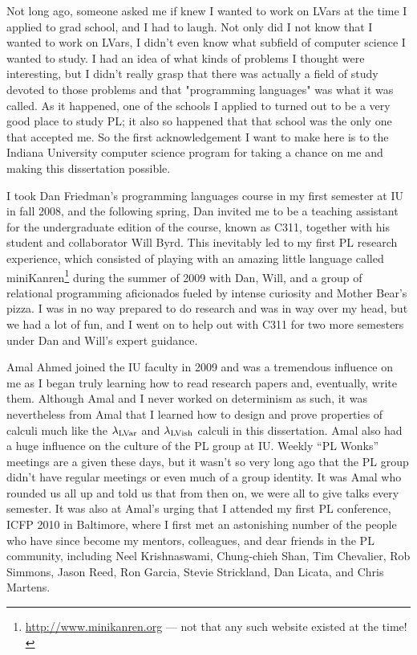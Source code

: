 Not long ago, someone asked me if knew I wanted to work on LVars at the time I applied to grad school, and I had to laugh.  Not only did I not know that I wanted to work on LVars, I didn't even know what subfield of computer science I wanted to study.  I had an idea of what kinds of problems I thought were interesting, but I didn't really grasp that there was actually a field of study devoted to those problems and that "programming languages" was what it was called.  As it happened, one of the schools I applied to turned out to be a very good place to study PL; it also so happened that that school was the only one that accepted me.  So the first acknowledgement I want to make here is to the Indiana University computer science program for taking a chance on me and making this dissertation possible.

I took Dan Friedman's programming languages course in my first semester at IU in fall 2008, and the following spring, Dan invited me to be a teaching assistant for the undergraduate edition of the course, known as C311, together with his student and collaborator Will Byrd.  This inevitably led to my first PL research experience, which consisted of playing with an amazing little language called miniKanren\footnote{\url{http://www.minikanren.org} --- not that any such website existed at the time!} during the summer of 2009 with Dan, Will, and a group of relational programming aficionados fueled by intense curiosity and Mother Bear's pizza.  I was in no way prepared to do research and was in way over my head, but we had a lot of fun, and I went on to help out with C311 for two more semesters under Dan and Will's expert guidance.

Amal Ahmed joined the IU faculty in 2009 and was a tremendous influence on me as I began truly learning how to read research papers and, eventually, write them.  Although Amal and I never worked on determinism as such, it was nevertheless from Amal that I learned how to design and prove properties of calculi much like the $\lambda_{\textrm{LVar}}$ and $\lambda_{\textrm{LVish}}$ calculi in this dissertation.  Amal also had a huge influence on the culture of the PL group at IU.  Weekly ``PL Wonks'' meetings are a given these days, but it wasn't so very long ago that the PL group didn't have regular meetings or even much of a group identity.  It was Amal who rounded us all up and told us that from then on, we were all to give talks every semester.  It was also at Amal's urging that I attended my first PL conference, ICFP 2010 in Baltimore, where I first met an astonishing number of the people who have since become my mentors, colleagues, and dear friends in the PL community, including Neel Krishnaswami, Chung-chieh Shan, Tim Chevalier, Rob Simmons, Jason Reed, Ron Garcia, Stevie Strickland, Dan Licata, and Chris Martens.

